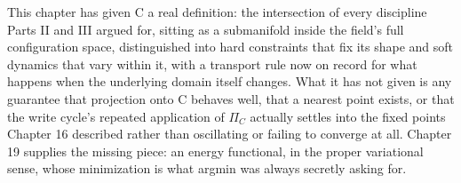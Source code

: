 This chapter has given C a real definition: the intersection of every discipline Parts II and III argued for, sitting as a submanifold inside the field's full configuration space, distinguished into hard constraints that fix its shape and soft dynamics that vary within it, with a transport rule now on record for what happens when the underlying domain itself changes. What it has not given is any guarantee that projection onto C behaves well, that a nearest point exists, or that the write cycle's repeated application of \(\Pi_C\) actually settles into the fixed points Chapter 16 described rather than oscillating or failing to converge at all. Chapter 19 supplies the missing piece: an energy functional, in the proper variational sense, whose minimization is what argmin was always secretly asking for.
